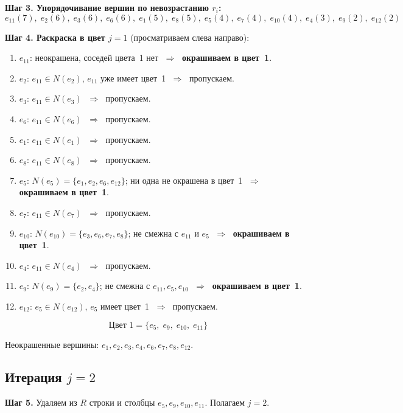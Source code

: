 \documentclass[a4paper,12pt]{article}
\begin{document}
\textbf{Шаг 3. Упорядочивание вершин по невозрастанию $r_i$:}
\[
	e_{11}(7),\; e_2(6),\; e_3(6),\; e_6(6),\; e_1(5),\; e_8(5),\;
	e_5(4),\; e_7(4),\; e_{10}(4),\; e_4(3),\; e_9(2),\; e_{12}(2)
\]

\textbf{Шаг 4. Раскраска в цвет $j = 1$} (просматриваем слева направо):

\begin{enumerate}
	\item $e_{11}$: неокрашена, соседей цвета~1 нет
	      $\;\Rightarrow\;$ \textbf{окрашиваем в цвет~1}.
	\item $e_2$: $e_{11} \in N(e_2)$, $e_{11}$ уже имеет цвет~1 $\;\Rightarrow\;$ пропускаем.
	\item $e_3$: $e_{11} \in N(e_3)$ $\;\Rightarrow\;$ пропускаем.
	\item $e_6$: $e_{11} \in N(e_6)$ $\;\Rightarrow\;$ пропускаем.
	\item $e_1$: $e_{11} \in N(e_1)$ $\;\Rightarrow\;$ пропускаем.
	\item $e_8$: $e_{11} \in N(e_8)$ $\;\Rightarrow\;$ пропускаем.
	\item $e_5$: $N(e_5) = \{e_1, e_2, e_6, e_{12}\}$; ни одна не окрашена в цвет~1
	      $\;\Rightarrow\;$ \textbf{окрашиваем в цвет~1}.
	\item $e_7$: $e_{11} \in N(e_7)$ $\;\Rightarrow\;$ пропускаем.
	\item $e_{10}$: $N(e_{10}) = \{e_3, e_6, e_7, e_8\}$; не смежна с $e_{11}$ и $e_5$
	      $\;\Rightarrow\;$ \textbf{окрашиваем в цвет~1}.
	\item $e_4$: $e_{11} \in N(e_4)$ $\;\Rightarrow\;$ пропускаем.
	\item $e_9$: $N(e_9) = \{e_2, e_4\}$; не смежна с $e_{11}, e_5, e_{10}$
	      $\;\Rightarrow\;$ \textbf{окрашиваем в цвет~1}.
	\item $e_{12}$: $e_5 \in N(e_{12})$, $e_5$ имеет цвет~1 $\;\Rightarrow\;$ пропускаем.
\end{enumerate}

\[
	\boxed{\text{Цвет~1} = \{e_5,\; e_9,\; e_{10},\; e_{11}\}}
\]

Неокрашенные вершины: $e_1, e_2, e_3, e_4, e_6, e_7, e_8, e_{12}$.

\subsection*{Итерация $j = 2$}

\textbf{Шаг 5.} Удаляем из $R$ строки и столбцы $e_5, e_9, e_{10}, e_{11}$. Полагаем $j = 2$.
\end{document}
